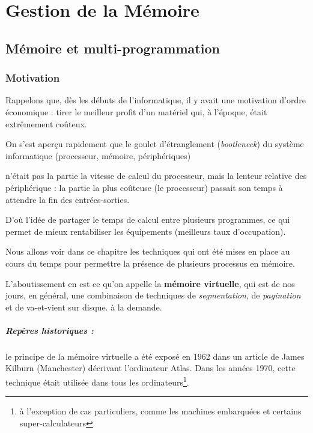 \chapter{Gestion de la Mémoire}

\begin{multicols}{2}  


\section{Mémoire et multi-programmation}
\subsection{Motivation}


Rappelons que, dès les débuts de l'informatique, il y avait
une motivation d'ordre économique : tirer le meilleur
profit d'un matériel qui, à l'époque, était extrêmement coûteux.


On s'est aperçu rapidement que le goulet d'étranglement (\emph{bootleneck})
du système informatique (processeur, mémoire, périphériques)



n'était pas la partie la vitesse de calcul du processeur,
mais la lenteur relative des périphérique : la partie la plus coûteuse 
(le processeur) passait son temps à attendre la fin des entrées-sorties. 




D'où l'idée
de partager le temps de calcul entre plusieurs programmes,
ce qui permet de mieux rentabiliser les équipements (meilleurs 
taux d'occupation).

Nous allons voir dans ce chapitre 
les techniques qui ont 
été mises en place au cours du temps pour 
permettre la présence de plusieurs processus en mémoire.

L'aboutissement en est ce qu'on appelle la 
\textbf{mémoire virtuelle}, 
qui est de nos jours, en général, une
combinaison de techniques de \emph{segmentation}, de \emph{pagination}
et de va-et-vient sur disque.
à la demande. 


\paragraph{Repères historiques :} le principe de la mémoire virtuelle
a été exposé en 1962 dans un article de James Kilburn (Manchester) 
décrivant l'ordinateur Atlas.
Dans les années 1970, cette technique était utilisée dans tous 
les ordinateurs\footnote{à l'exception de cas particuliers, comme 
les machines embarquées  et certains super-calculateurs}.


\end{multicols}
